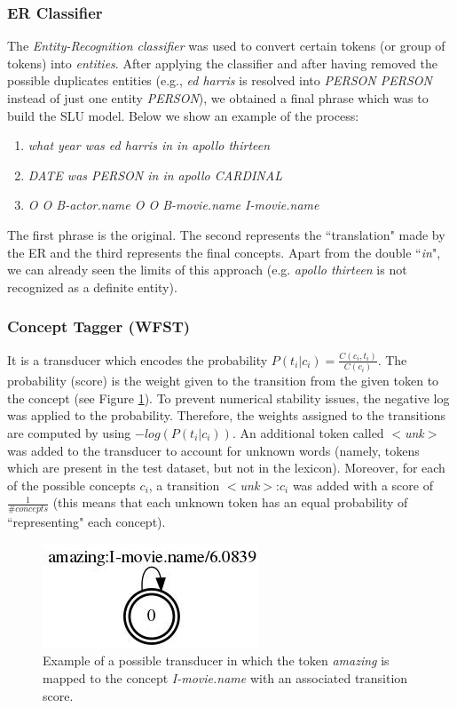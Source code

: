 \documentclass[11pt,a4paper]{article}
\begin{document}
\subsubsection{ER Classifier}

The \textit{Entity-Recognition classifier} was used to convert certain tokens (or group of tokens) into \textit{entities}. After applying the classifier and after having removed the possible duplicates entities (e.g., \textit{ed harris} is resolved into \textit{PERSON PERSON} instead of just one entity \textit{PERSON}), we obtained a final phrase which was to build the SLU model. Below we show an example of the process:

\begin{enumerate}[noitemsep]
\item \textit{what year was ed harris in in apollo thirteen}
\item \textit{DATE was PERSON in in apollo CARDINAL}
\item \textit{O O B-actor.name O O B-movie.name I-movie.name}
\end{enumerate}

The first phrase is the original. The second represents the ``translation" made by the ER and the third represents the final concepts. Apart from the double ``\textit{in}", we can already seen the limits of this approach (e.g. \textit{apollo thirteen} is not recognized as a definite entity). 

\subsubsection{Concept Tagger (WFST)}
It is a transducer which encodes the probability $P(t_i|c_i) = \frac{C(c_i, t_i)}{C(c_i)}$. The probability (score) is the weight given to the transition from the given token to the concept (see Figure \ref{fig:transducer}). To prevent numerical stability issues, the negative log was applied to the probability. Therefore, the weights assigned to the transitions are computed by using $-log(P(t_i|c_i))$. An additional token called $<$\textit{unk}$>$ was added to the transducer to account for unknown words (namely, tokens which are present in the test dataset, but not in the lexicon). Moreover, for each of the possible concepts $c_i$, a transition $<$\textit{unk}$>$:$c_i$ was added with a score of $\frac{1}{\#concepts}$ (this means that each unknown token has an equal probability of ``representing" each concept). 

\begin{figure}[b!]
	\centering
	\includegraphics[width=0.5\linewidth]{img/pos-tagger}
	\caption{Example of a possible transducer in which the token \textit{amazing} is mapped to the concept \textit{I-movie.name} with an associated transition score.}
	\label{fig:transducer}
\end{figure}
\end{document}
